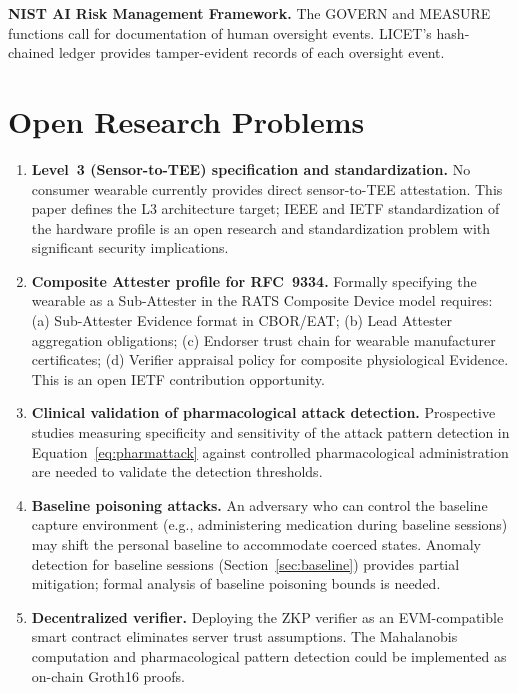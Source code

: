 \documentclass[12pt,a4paper]{article}
\begin{document}
\textbf{NIST AI Risk Management Framework.} The GOVERN and MEASURE functions
call for documentation of human oversight events. LICET's hash-chained ledger
provides tamper-evident records of each oversight event.

\section{Open Research Problems}

\begin{enumerate}
  \item \textbf{Level~3 (Sensor-to-TEE) specification and standardization.}
  No consumer wearable currently provides direct sensor-to-TEE attestation.
  This paper defines the L3 architecture target; IEEE and IETF standardization
  of the hardware profile is an open research and standardization problem with
  significant security implications.

  \item \textbf{Composite Attester profile for RFC~9334.} Formally specifying
  the wearable as a Sub-Attester in the RATS Composite Device model requires:
  (a) Sub-Attester Evidence format in CBOR/EAT; (b) Lead Attester aggregation
  obligations; (c) Endorser trust chain for wearable manufacturer certificates;
  (d) Verifier appraisal policy for composite physiological Evidence. This is
  an open IETF contribution opportunity.

  \item \textbf{Clinical validation of pharmacological attack detection.}
  Prospective studies measuring specificity and sensitivity of the attack
  pattern detection in Equation~\ref{eq:pharmattack} against controlled
  pharmacological administration are needed to validate the detection thresholds.

  \item \textbf{Baseline poisoning attacks.} An adversary who can control the
  baseline capture environment (e.g., administering medication during baseline
  sessions) may shift the personal baseline to accommodate coerced states.
  Anomaly detection for baseline sessions (Section~\ref{sec:baseline}) provides
  partial mitigation; formal analysis of baseline poisoning bounds is needed.

  \item \textbf{Decentralized verifier.} Deploying the ZKP verifier as an
  EVM-compatible smart contract eliminates server trust assumptions. The
  Mahalanobis computation and pharmacological pattern detection could be
  implemented as on-chain Groth16 proofs.


\end{enumerate}
\end{document}
